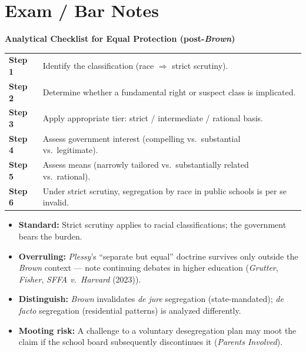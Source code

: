 \section{Exam / Bar Notes}

\begin{tcolorbox}[sidenotebox]
  \textbf{\color{navyblue}Analytical Checklist for Equal Protection (post-\textit{Brown})}\\[4pt]
  \begin{tabularx}{\linewidth}{@{}>{\color{navyblue}\bfseries}l@{\hspace{6mm}}>{\raggedright\arraybackslash}X@{}}
    Step 1 & Identify the classification (race $\Rightarrow$ strict scrutiny).               \\[2pt]
    Step 2 & Determine whether a fundamental right or suspect class is implicated.           \\[2pt]
    Step 3 & Apply appropriate tier: strict / intermediate / rational basis.                  \\[2pt]
    Step 4 & Assess government interest (compelling vs.\ substantial vs.\ legitimate).       \\[2pt]
    Step 5 & Assess means (narrowly tailored vs.\ substantially related vs.\ rational).      \\[2pt]
    Step 6 & Under strict scrutiny, segregation by race in public schools is per se invalid. \\
  \end{tabularx}
\end{tcolorbox}

\begin{itemize}[leftmargin=1.2em, itemsep=2pt, topsep=2pt]
  \item \textbf{Standard:} Strict scrutiny applies to racial classifications; the government bears the burden.
  \item \textbf{Overruling:} \textit{Plessy}'s ``separate but equal'' doctrine survives only outside the \textit{Brown} context --- note continuing debates in higher education (\textit{Grutter}, \textit{Fisher}, \textit{SFFA v.\ Harvard} (2023)).
  \item \textbf{Distinguish:} \textit{Brown} invalidates \textit{de jure} segregation (state-mandated); \textit{de facto} segregation (residential patterns) is analyzed differently.
  \item \textbf{Mooting risk:} A challenge to a voluntary desegregation plan may moot the claim if the school board subsequently discontinues it (\textit{Parents Involved}).
\end{itemize}

